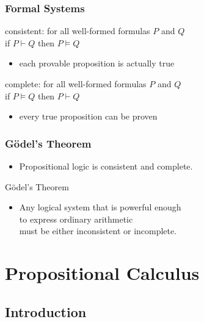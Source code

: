 \documentclass[dvipsnames]{beamer}
\begin{document}
\begin{frame}
  \frametitle{Formal Systems}

  \begin{definition}
    \alert{consistent}: for all well-formed formulas $P$ and $Q$\\
      if $P \vdash Q$ then $P \vDash Q$

    \begin{itemize}
      \item each provable proposition is actually true
    \end{itemize}
  \end{definition}

  \pause
  \begin{definition}
    \alert{complete}: for all well-formed formulas $P$ and $Q$\\
      if $P \vDash Q$ then $P \vdash Q$
    \begin{itemize}
      \item every true proposition can be proven
    \end{itemize}
  \end{definition}
\end{frame}

\begin{frame}
  \frametitle{Gödel's Theorem}

  \begin{itemize}
    \item Propositional logic is consistent and complete.
  \end{itemize}

  \pause
  \begin{block}{Gödel's Theorem}
    \begin{itemize}
      \item Any logical system that is powerful enough\\
        to express ordinary arithmetic\\
        must be either inconsistent or incomplete.
    \end{itemize}
  \end{block}
\end{frame}

\section{Propositional Calculus}

\subsection{Introduction}
\end{document}
